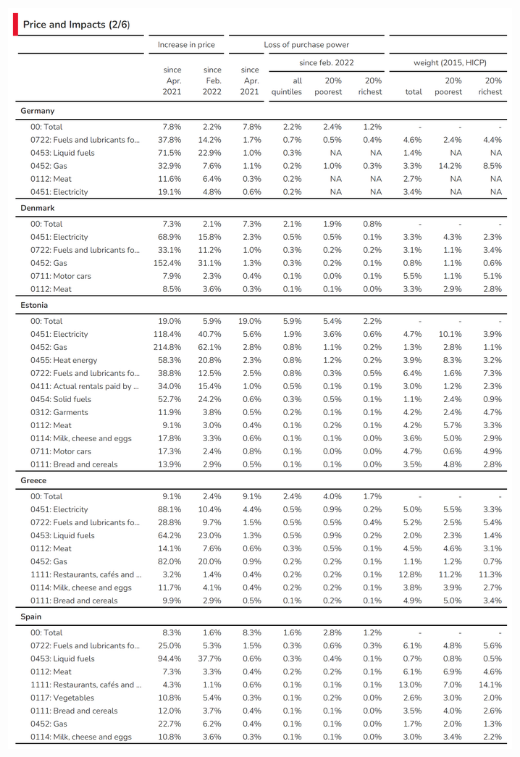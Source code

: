 \documentclass[
  9pt,
  a4paper,
  DIV=11,
  numbers=noendperiod,
  oneside]{scrartcl}
\begin{document}
\includegraphics[width=17cm,height=\textheight]{../svg/annex_2.png}
\end{document}
